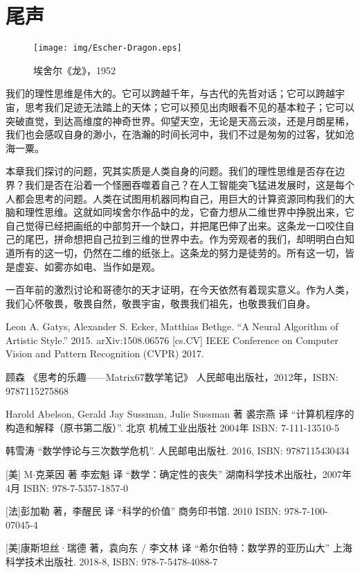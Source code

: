 \documentclass{article}
\begin{document}
\section{尾声}

\begin{wrapfigure}{R}{0.6\textwidth}
 \centering
 \texttt{[image: img/Escher-Dragon.eps]}
 \caption{埃舍尔《龙》，1952}
 \label{fig:Escher-Dragon}
\end{wrapfigure}

我们的理性思维是伟大的。它可以跨越千年，与古代的先哲对话；它可以跨越宇宙，思考我们足迹无法踏上的天体；它可以预见出肉眼看不见的基本粒子；它可以突破直觉，到达高维度的神奇世界。仰望天空，无论是天高云淡，还是月朗星稀，我们也会感叹自身的渺小，在浩瀚的时间长河中，我们不过是匆匆的过客，犹如沧海一粟。

本章我们探讨的问题，究其实质是人类自身的问题。我们的理性思维是否存在边界？我们是否在沿着一个怪圈吞噬着自己？在人工智能突飞猛进发展时，这是每个人都会思考的问题。人类在试图用机器同构自己，用巨大的计算资源同构我们的大脑和理性思维。这就如同埃舍尔作品中的龙，它奋力想从二维世界中挣脱出来，它自己觉得已经把画纸的中部剪开一个缺口，并把尾巴伸了出来。这条龙一口咬住自己的尾巴，拼命想把自己拉到三维的世界中去。作为旁观者的我们，却明明白白知道所有的这一切，仍然在二维的纸张上。这条龙的努力是徒劳的。所有这一切，皆是虚妄、如雾亦如电、当作如是观。

一百年前的激烈讨论和哥德尔的天才证明，在今天依然有着现实意义。作为人类，我们心怀敬畏，敬畏自然，敬畏宇宙，敬畏我们祖先，也敬畏我们自身。

\ifx\wholebook\relax \else
\begin{thebibliography}{99}

Leon A. Gatys, Alexander S. Ecker, Matthias Bethge. ``A Neural Algorithm of Artistic Style.'' 2015. arXiv:1508.06576 [cs.CV] IEEE Conference on Computer Vision and Pattern Recognition (CVPR) 2017.

顾森 《思考的乐趣——Matrix67数学笔记》 人民邮电出版社，2012年，ISBN: 9787115275868

Harold Abelson, Gerald Jay Sussman, Julie Sussman 著 裘宗燕 译 ``计算机程序的构造和解释（原书第二版）''. 北京 机械工业出版社 2004年 ISBN: 7-111-13510-5

韩雪涛 ``数学悖论与三次数学危机''. 人民邮电出版社. 2016, ISBN: 9787115430434

[美] M$\cdot$克莱因 著 李宏魁 译 ``数学：确定性的丧失'' 湖南科学技术出版社，2007年4月 ISBN: 978-7-5357-1857-0

[法]彭加勒 著，李醒民 译 ``科学的价值'' 商务印书馆. 2010 ISBN: 978-7-100-07045-4

[美]康斯坦丝·瑞德 著，袁向东 / 李文林 译 ``希尔伯特：数学界的亚历山大'' 上海科学技术出版社. 2018-8, ISBN: 978-7-5478-4088-7

\end{thebibliography}

\expandafter\enddocument

\fi
\end{document}
